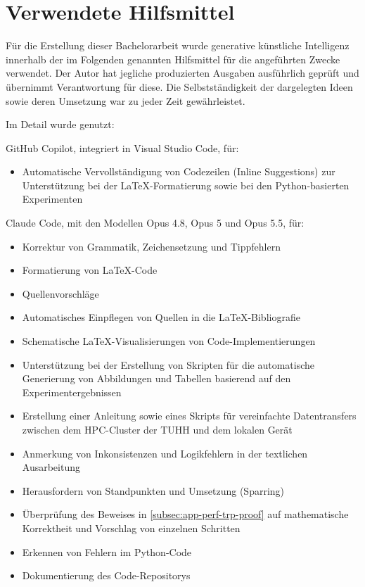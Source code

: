 \documentclass[12pt,final,twoside]{report}
\theoremstyle{plain}
\theoremstyle{definition}
\theoremstyle{remark}
\begin{document}
\newpage
\thispagestyle{empty}
\hspace{1cm}
\newpage


\vspace{2cm}
\chapter*{Verwendete Hilfsmittel}
\label{sec:tool-usage-de}
Für die Erstellung dieser Bachelorarbeit wurde generative künstliche Intelligenz innerhalb
der im Folgenden genannten Hilfsmittel für die angeführten Zwecke verwendet. Der Autor
hat jegliche produzierten Ausgaben ausführlich geprüft und übernimmt Verantwortung für diese.
Die Selbstständigkeit der dargelegten Ideen sowie deren Umsetzung war zu jeder
Zeit gewährleistet.

Im Detail wurde genutzt:

GitHub Copilot, integriert in Visual Studio Code, für:
\begin{itemize}
  \item Automatische Vervollständigung von Codezeilen (\glqq Inline Suggestions\grqq{}) zur Unterstützung
  bei der \LaTeX-Formatierung sowie bei den Python-basierten Experimenten
\end{itemize}

Claude Code, mit den Modellen Opus 4.8, Opus 5 und Opus 5.5, für:
\begin{itemize}
  \item Korrektur von Grammatik, Zeichensetzung und Tippfehlern
  \item Formatierung von \LaTeX-Code
  \item Quellenvorschläge
  \item Automatisches Einpflegen von Quellen in die \LaTeX-Bibliografie
  \item Schematische \LaTeX-Visualisierungen von Code-Implementierungen
  \item Unterstützung bei der Erstellung von Skripten für die automatische Generierung von Abbildungen und Tabellen basierend
  auf den Experimentergebnissen
  \item Erstellung einer Anleitung sowie eines Skripts für vereinfachte Datentransfers zwischen dem HPC-Cluster der TUHH und
  dem lokalen Gerät
  \item Anmerkung von Inkonsistenzen und Logikfehlern in der textlichen Ausarbeitung
  \item Herausfordern von Standpunkten und Umsetzung (\glqq Sparring\grqq{})
  \item Überprüfung des Beweises in \cref{subsec:app-perf-trp-proof} auf mathematische Korrektheit und Vorschlag von einzelnen Schritten
  \item Erkennen von Fehlern im Python-Code
  \item Dokumentierung des Code-Repositorys
\end{itemize}

\newpage
\thispagestyle{empty}
\hspace{1cm}
\newpage
\end{document}
